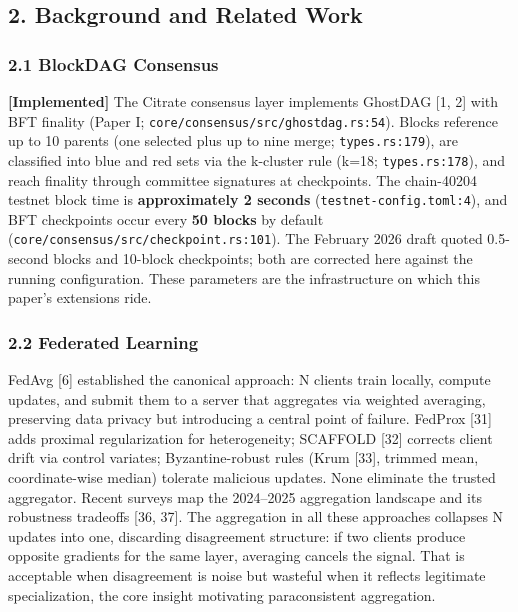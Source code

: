 \subsection{2. Background and Related
Work}\label{background-and-related-work}

\subsubsection{2.1 BlockDAG Consensus}\label{blockdag-consensus}

\textbf{{[}Implemented{]}} The Citrate consensus layer implements
GhostDAG {[}1, 2{]} with BFT finality (Paper I;
\texttt{core/consensus/src/ghostdag.rs:54}). Blocks reference up to 10
parents (one selected plus up to nine merge; \texttt{types.rs:179}), are
classified into blue and red sets via the k-cluster rule (k=18;
\texttt{types.rs:178}), and reach finality through committee signatures
at checkpoints. The chain-40204 testnet block time is
\textbf{approximately 2 seconds} (\texttt{testnet-config.toml:4}), and
BFT checkpoints occur every \textbf{50 blocks} by default
(\texttt{core/consensus/src/checkpoint.rs:101}). The February 2026 draft
quoted 0.5-second blocks and 10-block checkpoints; both are corrected
here against the running configuration. These parameters are the
infrastructure on which this paper's extensions ride.

\subsubsection{2.2 Federated Learning}\label{federated-learning}

FedAvg {[}6{]} established the canonical approach: N clients train
locally, compute updates, and submit them to a server that aggregates
via weighted averaging, preserving data privacy but introducing a
central point of failure. FedProx {[}31{]} adds proximal regularization
for heterogeneity; SCAFFOLD {[}32{]} corrects client drift via control
variates; Byzantine-robust rules (Krum {[}33{]}, trimmed mean,
coordinate-wise median) tolerate malicious updates. None eliminate the
trusted aggregator. Recent surveys map the 2024--2025 aggregation
landscape and its robustness tradeoffs {[}36, 37{]}. The aggregation in
all these approaches collapses N updates into one, discarding
disagreement structure: if two clients produce opposite gradients for
the same layer, averaging cancels the signal. That is acceptable when
disagreement is noise but wasteful when it reflects legitimate
specialization, the core insight motivating paraconsistent aggregation.


